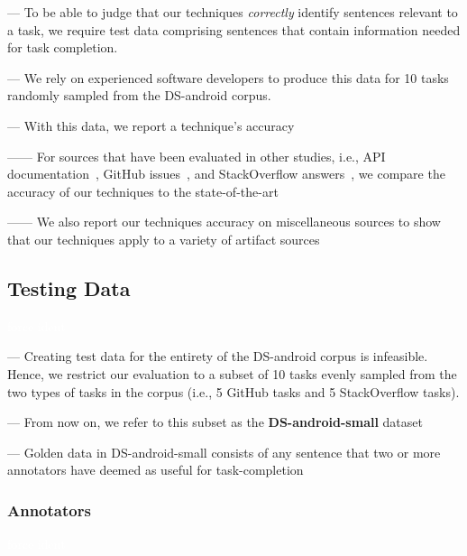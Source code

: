 
--- To be able to judge that our techniques \textit{correctly} identify sentences relevant to a task,
we require test data comprising sentences that contain information needed for task completion. \vspace{3mm}

--- We rely on experienced software developers to produce this data for 10 tasks randomly sampled from the \acs{DS-android} corpus. \vspace{3mm}


--- With this data, we report a technique's accuracy

------ For sources that have been evaluated in other studies, i.e., API documentation~\cite{Robillard2015}, GitHub issues~\cite{Lotufo2012}, and StackOverflow answers~\cite{Xu2017}, we compare the accuracy of our techniques 
to the state-of-the-art

------ We also report our techniques accuracy on miscellaneous sources to show that our techniques apply to a variety of artifact sources



\subsection{Testing Data}
\textcolor{white}{force ident} %

--- Creating test data for the entirety of the \acs{DS-android} corpus is infeasible. Hence, we restrict our evaluation to a subset of 10 tasks evenly sampled from the two types of tasks in the corpus (i.e., 5 GitHub tasks and 5 StackOverflow tasks). \vspace{3mm}

--- From now on, we refer to this subset as the \textbf{\acs{DS-android-small}} dataset \vspace{3mm}

--- Golden data in \acs{DS-android-small} consists of any sentence that two or more annotators have deemed as useful for task-completion \vspace{3mm}



\subsubsection{Annotators}
\textcolor{white}{force ident} %

